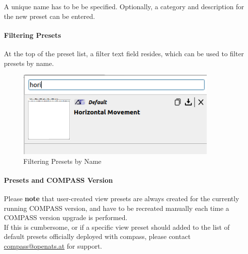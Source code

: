 A unique name has to be be specified. Optionally, a category and description for the new preset can be entered.

\paragraph*{Filtering Presets} At the top of the preset list, a filter text field resides, which can be used to filter presets by name.

\begin{figure}[H]
    \center
    \includegraphics[width=10cm]{figures/view_preset_filter.png}
  \caption{Filtering Presets by Name}
\end{figure}

\paragraph*{Presets and COMPASS Version}

Please \textbf{note} that user-created view presets are always created for the currently running COMPASS version, 
and have to be recreated manually each time a COMPASS version upgrade is performed. \\

If this is cumbersome, or if a specific view preset should added to the list of default presets officially deployed with compass, 
please contact \href{mailto:compass@openats.at}{compass@openats.at} for support.
